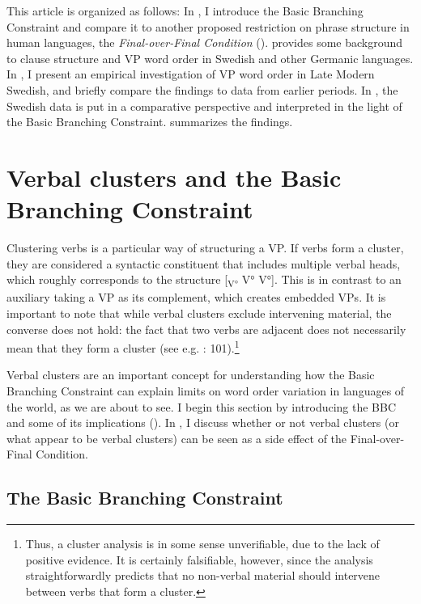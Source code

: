 \documentclass[output=paper, colorlinks, citecolor=brown]{langscibook}
\begin{document}
This article is organized as follows: In , I introduce the Basic Branching Constraint and compare it to another proposed restriction on phrase structure in human languages, the \textit{Final-over-Final Condition} (\citealt{BiberauerEtAl2014,SheehanEtAl2017}).  provides some background to clause structure and VP word order in Swedish and other Germanic languages. In , I present an empirical investigation of VP word order in Late Modern Swedish, and briefly compare the findings to data from earlier periods. In , the Swedish data is put in a comparative perspective and interpreted in the light of the Basic Branching Constraint.  summarizes the findings.


\section{Verbal clusters and the Basic Branching Constraint}\label{sec:sangfelt:2}

Clustering verbs is a particular way of structuring a VP. If verbs form a cluster, they are considered a syntactic constituent that includes multiple verbal heads, which roughly corresponds to the structure [\textsubscript{V°} V° V°]. This is in contrast to an auxiliary taking a VP as its complement, which creates embedded VPs. It is important to note that while verbal clusters exclude intervening material, the converse does not hold: the fact that two verbs are adjacent does not necessarily mean that they form a cluster (see e.g. \citealt{Sheehan2017Final}: 101).\footnote{Thus, a cluster analysis is in some sense unverifiable, due to the lack of positive evidence. It is certainly falsifiable, however, since the analysis straightforwardly predicts that no non-verbal material should intervene between verbs that form a cluster.}


Verbal clusters are an important concept for understanding how the Basic Branching Constraint can explain limits on word order variation in languages of the world, as we are about to see. I begin this section by introducing the BBC and some of its implications (). In , I discuss whether or not verbal clusters (or what appear to be verbal clusters) can be seen as a side effect of the Final-over-Final Condition.


\subsection{The Basic Branching Constraint}\label{sec:sangfelt:2.1}
\end{document}
